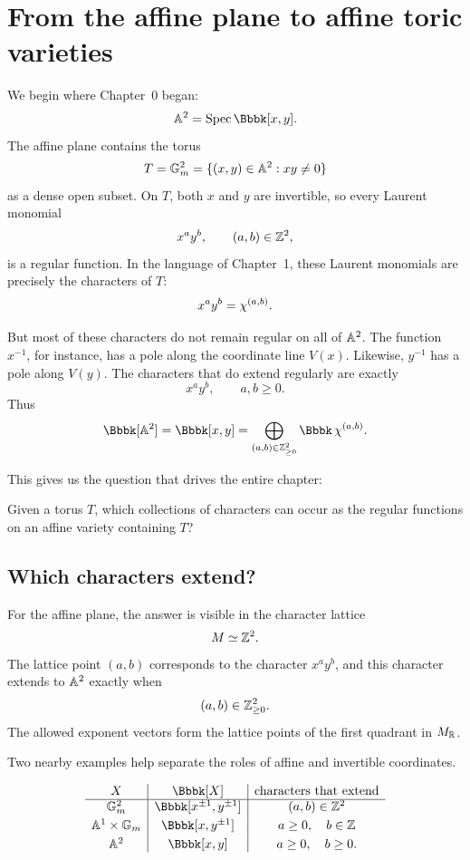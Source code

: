 \section{From the affine plane to affine toric varieties}
\label{sec:affine-plane-to-affine-toric-varieties}

We begin where Chapter~0 began:
\[
\AAA^2=\Spec\Bbbk[x,y].
\]
The affine plane contains the torus
\[
T=\mathbb{G}_{m}^2
=
\{(x,y)\in\mathbb{A}^2:xy\neq0\}
\]
as a dense open subset. On \(T\), both \(x\) and \(y\) are invertible,
so every Laurent monomial
\[
x^ay^b,
\qquad
(a,b)\in\mathbb{Z}^2,
\]
is a regular function. In the language of Chapter~1, these Laurent
monomials are precisely the characters of \(T\):
\[
x^ay^b=\chi^{(a,b)}.
\]

But most of these characters do not remain regular on all of
\(\mathbb{A}^2\). The function \(x^{-1}\), for instance, has a pole along
the coordinate line \(V(x)\). Likewise, \(y^{-1}\) has a pole along
\(V(y)\). The characters that do extend regularly are exactly
\[
x^ay^b,
\qquad
a,b\geq0.
\]
Thus
\[
\Bbbk[\AAA^2]
=
\Bbbk[x,y]
=
\bigoplus_{(a,b)\in\ZZ_{\geq0}^2}
\Bbbk\,\character{(a,b)}.
\]

This gives us the question that drives the entire chapter:

\begin{guidingquestion}
Given a torus \(T\), which collections of characters can occur as the
regular functions on an affine variety containing \(T\)?
\end{guidingquestion}

\subsection{Which characters extend?}

For the affine plane, the answer is visible in the character lattice
\[
M\simeq\mathbb{Z}^2.
\]
The lattice point \((a,b)\) corresponds to the character \(x^ay^b\),
and this character extends to \(\mathbb{A}^2\) exactly when
\[
(a,b)\in\mathbb{Z}_{\geq0}^2.
\]
The allowed exponent vectors form the lattice points of the first
quadrant in \(M_{\mathbb{R}}\).

Two nearby examples help separate the roles of affine and invertible
coordinates.

\[
\begin{array}{c|c|c}
X
&
\Bbbk[X]
&
\text{characters that extend}
\\
\hline
\Gm^2
&
\Bbbk[x^{\pm1},y^{\pm1}]
&
(a,b)\in\ZZ^2
\\[1mm]
\AAA^1\times\Gm
&
\Bbbk[x,y^{\pm1}]
&
a\geq0,\quad b\in\ZZ
\\[1mm]
\AAA^2
&
\Bbbk[x,y]
&
a\geq0,\quad b\geq0.
\end{array}
\]


